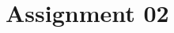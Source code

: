 \documentclass[12pt,a4paper,ngerman]{exam}
\begin{document}
\section*{Assignment 02}
\begin{questions}







\end{questions}
\end{document}
